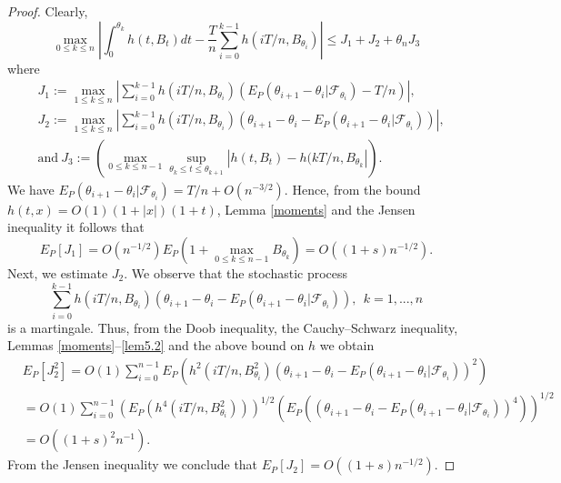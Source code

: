 \documentclass{amsart}
\numberwithin{equation}{section}
\begin{document}
\begin{proof}
Clearly,
\[\max_{0\leq k\leq n}\left|\int_{0}^{\theta_k} h(t,B_t) dt-\frac{T}{n}\sum_{i=0}^{k-1} h(i T/n, B_{\theta_i})\right|\leq J_1+J_2+\theta_n J_3\]
where
\begin{eqnarray*}
&J_1:=\max_{1\leq k\leq n}\left|\sum_{i=0}^{k-1}h(iT/n, B_{\theta_i})
\left(E_P(\theta_{i+1}-\theta_i|\mathcal F_{\theta_i})-T/n\right)\right|,\\
&J_2:=
\max_{1\leq k\leq n}\left|\sum_{i=0}^{k-1} h(iT/n, B_{\theta_i})
\left(\theta_{i+1}-\theta_i-E_P(\theta_{i+1}-\theta_i|\mathcal F_{\theta_i})\right)\right|,\\
&\mbox{and} \ J_3:=\left(\max_{0\leq k\leq n-1}\sup_{\theta_k\leq t\leq\theta_{k+1}}|h(t,B_t)-h(k T/n, B_{\theta_k}|\right).
\end{eqnarray*}
We have $E_P(\theta_{i+1}-\theta_i|\mathcal F_{\theta_i})=T/n+O(n^{-3/2})$. Hence, from the bound
$h(t,x)=O(1)(1+|x|)(1+t)$, Lemma \ref{moments} and the Jensen inequality it follows that
\[E_P[J_1]= O(n^{-1/2})E_P(1+\max_{0\leq k\leq n-1}B_{\theta_k})
=O((1+s)n^{-1/2}).\]
Next, we estimate $J_2$. We observe that the stochastic process
\[\sum_{i=0}^{k-1} h(iT/n, B_{\theta_i})
\left(\theta_{i+1}-\theta_i-E_P(\theta_{i+1}-\theta_i|\mathcal F_{\theta_i})\right), \ \ k=1,...,n\]
is a martingale. Thus, from the Doob inequality, the Cauchy--Schwarz inequality,
Lemmas \ref{moments}--\ref{lem5.2} and the above bound on $h$ we obtain
\begin{eqnarray*}
&E_P[J^2_2]= O(1)\sum_{i=0}^{n-1} E_P\left(h^2(i T/n, B^2_{\theta_i})\left(\theta_{i+1}-\theta_i-E_P(\theta_{i+1}-\theta_i|\mathcal F_{\theta_i})\right)^2 \right) \\
&=O(1)\sum_{i=0}^{n-1}\left(E_P\left(h^4(i T/n, B^2_{\theta_i})\right)\right)^{1/2}
 \left(E_P\left(\left(\theta_{i+1}-\theta_i-E_P(\theta_{i+1}-\theta_i|\mathcal F_{\theta_i})\right)^4\right)\right)^{1/2}\\
 &=O((1+s)^2 n^{-1}).
\end{eqnarray*}
From the Jensen inequality we conclude that $E_P[J_2]=O((1+s) n^{-1/2})$.


\end{proof}
\end{document}
